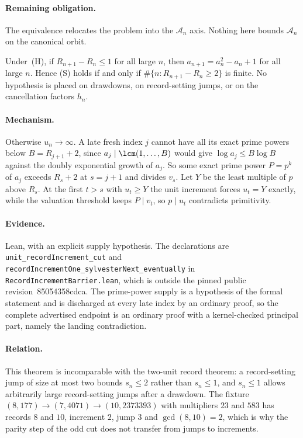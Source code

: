\documentclass[11pt]{article}
\renewcommand{\commitshort}{85054358cdca}
\begin{document}
\paragraph{Remaining obligation.}
The equivalence relocates the problem into the $\mathcal A_n$ axis.  Nothing
here bounds $\mathcal A_n$ on the canonical orbit.

\begin{theorem}\label{long243:res:unitrecord}
Under~(H), if $R_{n+1}-R_n\le1$ for all large $n$, then $a_{n+1}=a_n^2-a_n+1$
for all large $n$.  Hence (S) holds if and only if
$\#\{n:R_{n+1}-R_n\ge2\}$ is finite.  No hypothesis is placed on drawdowns, on
record-setting jumps, or on the cancellation factors $h_n$.
\end{theorem}

\paragraph{Mechanism.}
Otherwise $u_n\to\infty$.  A late fresh index $j$ cannot have all its exact prime
powers below $B=R_{j+1}+2$, since $a_j\mid\lcm(1,\ldots,B)$ would give
$\log a_j\le B\log B$ against the doubly exponential growth of $a_j$.  So some
exact prime power $P=p^{k}$ of $a_j$ exceeds $R_s+2$ at $s=j+1$ and divides
$v_s$.  Let $Y$ be the least multiple of $p$ above $R_s$.  At the first $t>s$
with $u_t\ge Y$ the unit increment forces $u_t=Y$ exactly, while the valuation
threshold keeps $P\mid v_t$, so $p\mid u_t$ contradicts primitivity.

\paragraph{Evidence.}
Lean, with an explicit supply hypothesis.  The declarations are
\texttt{unit\_recordIncrement\_cut} and
\texttt{recordIncrementOne\_sylvesterNext\_eventually} in
\texttt{RecordIncrementBarrier.lean}, which is outside the pinned public
revision~\commitshort.  The prime-power supply is a hypothesis of the formal
statement and is discharged at every late index by an ordinary proof, so the
complete advertised endpoint is an ordinary proof with a kernel-checked
principal part, namely the landing contradiction.

\paragraph{Relation.}
This theorem is incomparable with the two-unit record theorem: a record-setting
jump of size at most two bounds $s_n\le2$ rather than $s_n\le1$, and $s_n\le1$
allows arbitrarily large record-setting jumps after a drawdown.  The fixture
$(8,177)\to(7,4071)\to(10,2373393)$ with multipliers $23$ and $583$ has records
$8$ and $10$, increment $2$, jump $3$ and $\gcd(8,10)=2$, which is why the
parity step of the odd cut does not transfer from jumps to increments.
\end{document}
